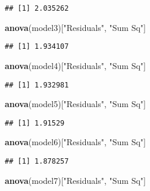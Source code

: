 \documentclass[
]{article}
\newenvironment{Shaded}{\begin{snugshade}}{\end{snugshade}}
\newcommand{\KeywordTok}[1]{\textcolor[rgb]{0.13,0.29,0.53}{\textbf{#1}}}
\newcommand{\NormalTok}[1]{#1}
\newcommand{\StringTok}[1]{\textcolor[rgb]{0.31,0.60,0.02}{#1}}
\begin{document}
\begin{verbatim}
## [1] 2.035262
\end{verbatim}

\begin{Shaded}
\begin{Highlighting}[]
\KeywordTok{anova}\NormalTok{(model3)[}\StringTok{"Residuals"}\NormalTok{, }\StringTok{"Sum Sq"}\NormalTok{]}
\end{Highlighting}
\end{Shaded}

\begin{verbatim}
## [1] 1.934107
\end{verbatim}

\begin{Shaded}
\begin{Highlighting}[]
\KeywordTok{anova}\NormalTok{(model4)[}\StringTok{"Residuals"}\NormalTok{, }\StringTok{"Sum Sq"}\NormalTok{]}
\end{Highlighting}
\end{Shaded}

\begin{verbatim}
## [1] 1.932981
\end{verbatim}

\begin{Shaded}
\begin{Highlighting}[]
\KeywordTok{anova}\NormalTok{(model5)[}\StringTok{"Residuals"}\NormalTok{, }\StringTok{"Sum Sq"}\NormalTok{]}
\end{Highlighting}
\end{Shaded}

\begin{verbatim}
## [1] 1.91529
\end{verbatim}

\begin{Shaded}
\begin{Highlighting}[]
\KeywordTok{anova}\NormalTok{(model6)[}\StringTok{"Residuals"}\NormalTok{, }\StringTok{"Sum Sq"}\NormalTok{]}
\end{Highlighting}
\end{Shaded}

\begin{verbatim}
## [1] 1.878257
\end{verbatim}

\begin{Shaded}
\begin{Highlighting}[]
\KeywordTok{anova}\NormalTok{(model7)[}\StringTok{"Residuals"}\NormalTok{, }\StringTok{"Sum Sq"}\NormalTok{]}
\end{Highlighting}
\end{Shaded}
\end{document}
